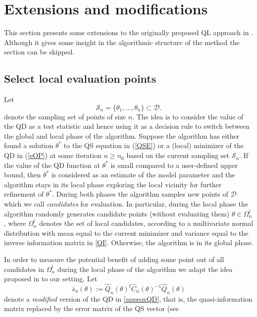 \documentclass[article, nojss]{jss}
\numberwithin{equation}{section}			%
\newcommand{\Sample}{\mathcal{S}}
\newcommand{\D}{\mathcal{D}}
\begin{document}
\section{Extensions and modifications}\label{sec:extent}
This section presents some extensions to the originally proposed QL approach in
\citet{Baaske2014}. Although it gives some insight in the algorithmic structure
of the method the section can be skipped.
%
\subsection{Select local evaluation points}\label{subsec:local}
Let
\begin{equation}\label{SS}
 \Sample_n=\{\theta_1,\ldots,\theta_n\}\subset\D.
\end{equation}
denote the sampling set of points of size $n$. The idea is to consider the
value of the QD as a test statistic and hence using it as a decision rule to
switch between the global and local phase of the algorithm. Suppose the
algorithm has either found a solution $\theta^*$ to the QS equation in (\ref{QSE}) or
a (local) minimizer of the QD in (\ref{eOP}) at some iteration $n\geq
n_0$ based on the current sampling set $\Sample_n$. If the value of the QD
function at $\theta^*$ is small compared to a user-defined upper bound, then
$\theta^*$ is considered as an estimate of the model parameter and the
algorithm stays in its local phase exploring the local vicinity for further refinement
of $\theta^*$. During both phases the algorithm samples new points of
$\D$ which we call \emph{candidates} for evaluation. In particular, during the
local phase the algorithm randomly generates candidate points (without
evaluating them) $\theta\in\Omega^l_n$, where $\Omega^l_n$ denotes the set of local
candidates, according to a multivariate normal distribution with mean equal to the current
minimizer and variance equal to the inverse information matrix in
\eqref{QI}. Otherwise, the algorithm is in its global phase.\par
%
In order to measure the potential benefit of adding some point out of all
candidates in $\Omega^l_n$ during the local phase of the algorithm we
adapt the idea proposed in \citet{ref:Regis2007} to our setting. Let
\begin{equation}
\bar{s}_n(\theta) := \hat{Q}_n(\theta)^t \hat{C}_n(\theta)^{-1} \hat{Q}_n(\theta)
\end{equation}
denote a \emph{modified} version of the QD in \eqref{approxQD}, that is, the
quasi-information matrix replaced by the error matrix of the QS vector (see
\end{document}
